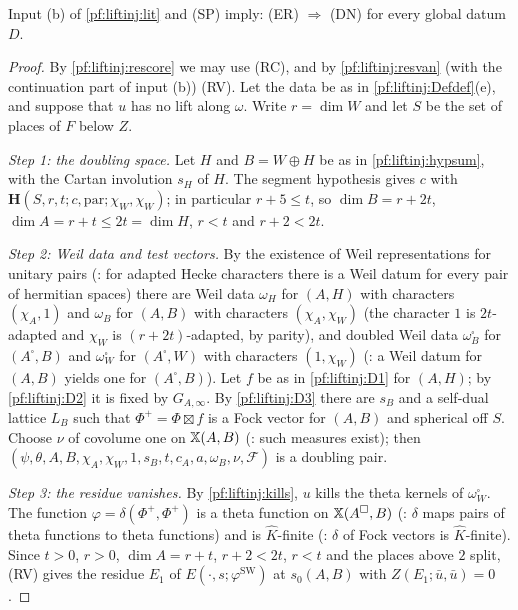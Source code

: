 \begin{theorem}\label{pf:liftinj:downne}
Input (b) of \cref{pf:liftinj:lit} and (SP) imply: (ER) $\Rightarrow$ (DN) for every global datum $D$.
\end{theorem}

\begin{proof}
By \cref{pf:liftinj:rescore} we may use (RC), and by \cref{pf:liftinj:resvan} (with the continuation part of input (b)) (RV). Let the data be as in
\cref{pf:liftinj:Defdef}(e), and suppose that $u$ has no lift along $\omega$. Write $r=\dim W$ and let $S$ be the set of places of $F$ below $Z$.

\emph{Step 1: the doubling space.} Let $H$ and $B=W\oplus H$ be as in \cref{pf:liftinj:hypsum}, with the Cartan involution $s_H$ of $H$. The segment
hypothesis gives $c$ with $\mathbf H(S,r,t;c,\mathrm{par};\chi_W,\chi_W)$; in particular $r+5\le t$, so $\dim B=r+2t$, $\dim A=r+t\le2t=\dim H$,
$r<t$ and $r+2<2t$.

\emph{Step 2: Weil data and test vectors.} By the existence of Weil representations for unitary pairs
(: for adapted Hecke characters there is a Weil datum for every pair of hermitian spaces) there are
Weil data $\omega_H$ for $(A,H)$ with characters $(\chi_A,1)$ and $\omega_B$ for $(A,B)$ with characters $(\chi_A,\chi_W)$ (the character $1$ is
$2t$-adapted and $\chi_W$ is $(r+2t)$-adapted, by parity), and doubled Weil data $\omega_B^\square$ for $(A^\square,B)$ and $\omega_W^\square$ for
$(A^\square,W)$ with characters $(1,\chi_W)$ (: a Weil datum for $(A,B)$ yields one for
$(A^\square,B)$). Let $f$ be as in \ref{pf:liftinj:D1} for $(A,H)$; by \ref{pf:liftinj:D2} it is fixed by $G_{A,\infty}$. By \ref{pf:liftinj:D3}
there are $s_B$ and a self-dual lattice $L_B$ such that $\Phi^+=\Phi\boxtimes f$ is a Fock vector for $(A,B)$ and spherical off $S$. Choose $\nu$ of
covolume one on $\mathbb{X}(A,B)$ (: such measures exist); then
$(\psi,\theta,A,B,\chi_A,\chi_W,1,s_B,t,c_A,a,\omega_B,\nu,\mathcal F)$ is a doubling pair.

\emph{Step 3: the residue vanishes.} By \cref{pf:liftinj:kills}, $u$ kills the theta kernels of $\omega_W^\square$. The function
$\varphi=\delta(\Phi^+,\Phi^+)$ is a theta function on $\mathbb{X}(A^\square,B)$ (: $\delta$ maps pairs
of theta functions to theta functions) and is $\hat K$-finite (: $\delta$ of Fock vectors is
$\hat K$-finite). Since $t>0$, $r>0$, $\dim A=r+t$, $r+2<2t$, $r<t$ and the places above $2$ split, (RV) gives the residue $E_1$ of
$E(\cdot,s;\varphi^{\mathrm{SW}})$ at $s_0(A,B)$ with $Z(E_1;\bar u,\bar u)=0$.


\end{proof}
